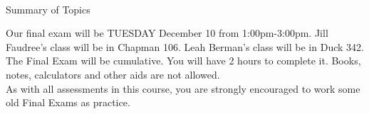 \documentclass[11pt,fleqn]{article}
\newcommand{\bc}{\begin{center}}
\newcommand{\ec}{\end{center}}
\begin{document}
\vspace*{-0.7in}

\begin{center}
  \large
  \\
\end{center}


\bc Summary of Topics \ec
Our final exam will be TUESDAY December 10 from 1:00pm-3:00pm. Jill Faudree's class will be in Chapman 106. Leah Berman's class will be in Duck 342. The Final Exam will be cumulative. You will have 2 hours to complete it. Books, notes, calculators and other aids are not allowed.\\
As with all assessments in this course, you are strongly encouraged to work some old Final Exams as practice.\\
\end{document}
